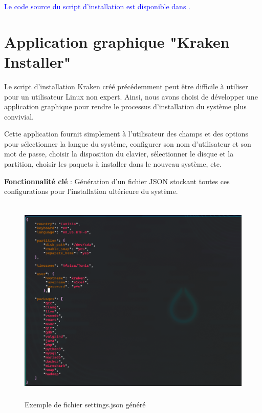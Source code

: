 \textcolor{blue}{Le code source du script d’installation est disponible dans  \cite{installateur_tui}.}


\section{Application graphique "Kraken Installer" }
\label{secc:graphapp}


Le script d'installation Kraken créé précédemment peut être difficile à utiliser pour un utilisateur Linux non expert. Ainsi, nous avons choisi de développer une application graphique pour rendre le processus d'installation du système plus convivial.




Cette application fournit simplement à l'utilisateur des champs et des options pour sélectionner la langue du système, configurer son nom d'utilisateur et son mot de passe, choisir la disposition du clavier, sélectionner le disque et la partition, choisir les paquets à installer dans le nouveau système, etc.

\textbf{Fonctionnalité clé} : Génération d'un fichier JSON stockant toutes ces configurations pour l'installation ultérieure du système.


\begin{figure}[H]
  \centering
  \includegraphics[width=1\textwidth, height=10cm]{images_pfe/jsonsettings.png}
  \caption{Exemple de fichier settings.json généré}
  \label{fig:jsonsettings}
\end{figure}


\clearpage
